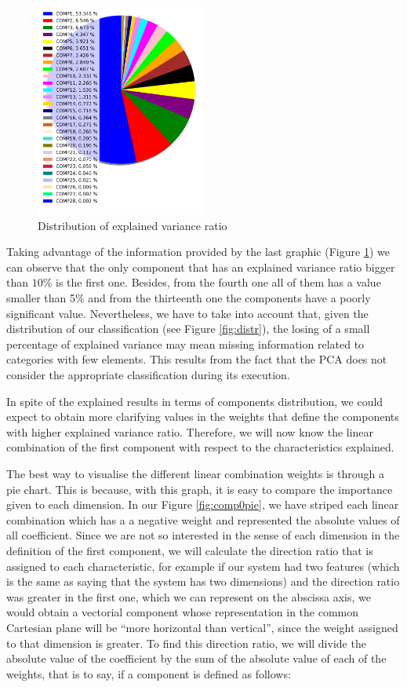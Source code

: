 \begin{figure}
	\centering%
	\centerline{\includegraphics[width=0.5\textwidth]{Imagenes/Bitmap/PCA/expvarpie.png}}%
	\caption{Distribution of explained variance ratio}%
	\label{fig:expvarpie}
\end{figure}

Taking advantage of the information provided by the last graphic (Figure \ref{fig:expvarpie}) we can observe that the only component that has an explained variance ratio bigger than $10$\% is the first one. Besides, from the fourth one all of them has a value smaller than 5\% and from the thirteenth one the components have a poorly significant value. Nevertheless, we have to take into account that, given the distribution of our classification (see Figure \ref{fig:distr}), the losing of a small percentage of explained variance may mean missing information related to categories with few elements. This results from the fact that the PCA does not consider the appropriate classification during its execution.

In spite of the explained results in terms of components distribution, we could expect to obtain more clarifying values in the weights that define the components with higher explained variance ratio. Therefore, we will now know the linear combination of the first component with respect to the characteristics explained.

The best way to visualise the different linear combination weights is through a pie chart. This is because, with this graph, it is easy to compare the importance given to each dimension. In our Figure \ref{fig:comp0pie}, we have striped each linear combination which has a a negative weight and represented the absolute values of all coefficient. Since we are not so interested in the sense of each dimension in the definition of the first component, we will calculate the direction ratio that is assigned to each characteristic, for example if our system had two features (which is the same as saying that the system has two dimensions) and the direction ratio was greater in the first one, which we can represent on the abscissa axis, we would obtain a vectorial component whose representation in the common Cartesian plane will be ``more horizontal than vertical'', since the weight assigned to that dimension is greater. To find this direction ratio, we will divide the absolute value of the coefficient by the sum of the absolute value of each of the weights, that is to say, if a component is defined as follows:

